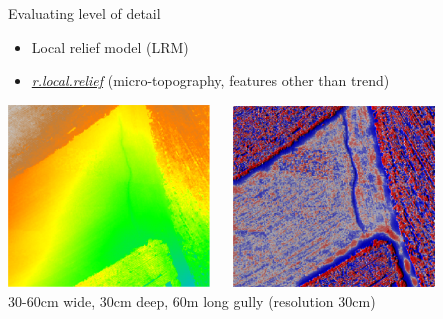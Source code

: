 \documentclass[xcolor={dvipsnames,usenames},beamer,aspectratio=169]{beamer}
\newcommand{\amodule}[1]{\href{http://grass.osgeo.org/grass70/manuals/addons/#1.html}{\emph{#1}}}
\begin{document}
\begin{frame}{Evaluating level of detail}

\begin{itemize}
  \item Local relief model (LRM)
  \item \amodule{r.local.relief} (micro-topography, features other than trend)
\end{itemize}

\begin{center}
  \includegraphics[width=0.4\textwidth]{vis/elevation}
  ~~
  \includegraphics[width=0.4\textwidth]{vis/lrm}\\
  \footnotesize
  30-60cm wide, 30cm deep, 60m long gully (resolution 30cm)
\end{center}

\end{frame}
\end{document}
